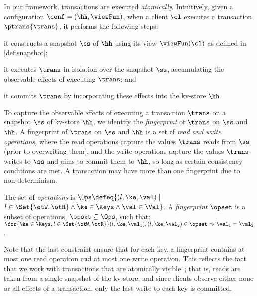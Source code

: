 In our framework, transactions are executed \emph{atomically}. 
Intuitively, given a configuration $\conf = (\hh, \viewFun)$, 
when a client $\cl$ executes a transaction $\ptrans{\trans}$, 
it performs the following steps: 
\begin{enumerate*}
	\item it constructs a snapshot $\ss$ of $\hh$ using its view $\viewFun(\cl)$ as defined in \cref{def:snapshot};  
	\item it executes $\trans$ in isolation over the snapshot $\ss$, accumulating the observable 
effects of executing $\trans$; and
	\item it commits $\trans$ by incorporating these effects into 
the kv-store $\hh$.
\end{enumerate*}


To capture the observable effects of executing a transaction $\trans$ on a snapshot $\ss$ of kv-store $\hh$, 
we identify the \emph{fingerprint} of $\trans$ on $\ss$ and $\hh$.
A fingerprint of $\trans$ on $\ss$ and $\hh$
is a set of \emph{read and write operations}, where
the read operations capture the values $\trans$ reads from $\ss$ (prior to overwriting them), and
the write operations capture the values $\trans$ writes to $\ss$ and aims to commit them to $\hh$, so long as certain consistency conditions are met.  
A transaction may have more than one fingerprint due to non-determinism. 








\begin{definition}[Fingerprints]
\label{beebop}
The set of \emph{operations} is 
$\Ops \defeq \{(l, \ke, \val) \mid$ $ l \in \Set{\otW, \otR} \land \ke \in \Keys \wedge \val \in \Val \}$.
A \emph{fingerprint} $\opset$ is a subset of operations, $\opset \subseteq \Ops$,
such that: 
$\for{\ke \in \Keys, l  \in \Set{\otW, \otR}}
	(l, \ke, \val_1), (l, \ke, \val_2) \in \opset \Rightarrow \val_1 = \val_2$.
\end{definition}
Note that the last constraint ensure that for each key, a fingerprint contains at most one read operation and at most one write operation.
This reflects the fact that we work with transactions that are
atomically visible~\cite{laws}; 
that is, reads are taken from a single snapshot of the kv-store, 
and since clients observe either none or all effects of a transaction, only the last write to each key is 
committed.

